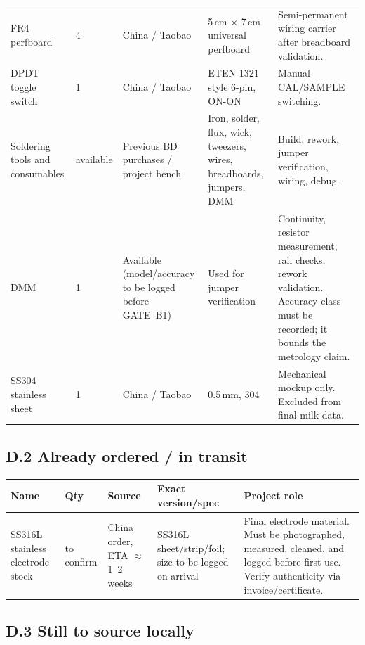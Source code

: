 \documentclass[11pt,a4paper]{article}
\begin{document}
\begin{xltabular}{\textwidth}{L{28mm}L{15mm}L{32mm}L{42mm}Y}
FR4 perfboard & 4 & China / Taobao & 5\,cm $\times$ 7\,cm universal perfboard & Semi-permanent wiring carrier after breadboard validation.\\
DPDT toggle switch & 1 & China / Taobao & ETEN 1321 style 6-pin, ON-ON & Manual CAL/SAMPLE switching.\\
Soldering tools and consumables & available & Previous BD purchases / project bench & Iron, solder, flux, wick, tweezers, wires, breadboards, jumpers, DMM & Build, rework, jumper verification, wiring, debug.\\
DMM & 1 & Available (model/accuracy to be logged before GATE~B1) & Used for jumper verification & Continuity, resistor measurement, rail checks, rework validation. Accuracy class must be recorded; it bounds the metrology claim.\\
SS304 stainless sheet & 1 & China / Taobao & 0.5\,mm, 304 & Mechanical mockup only. Excluded from final milk data.\\
\bottomrule
\end{xltabular}
\normalsize

\subsection{D.2 Already ordered / in transit}

\begin{xltabular}{\textwidth}{L{32mm}L{15mm}L{36mm}L{45mm}Y}
\toprule
\textbf{Name} & \textbf{Qty} & \textbf{Source} & \textbf{Exact version/spec} & \textbf{Project role}\\
\midrule
SS316L stainless electrode stock & to confirm & China order, ETA $\approx$ 1--2 weeks & SS316L sheet/strip/foil; size to be logged on arrival & Final electrode material. Must be photographed, measured, cleaned, and logged before first use. Verify authenticity via invoice/certificate.\\
\bottomrule
\end{xltabular}

\subsection{D.3 Still to source locally}
\end{document}
